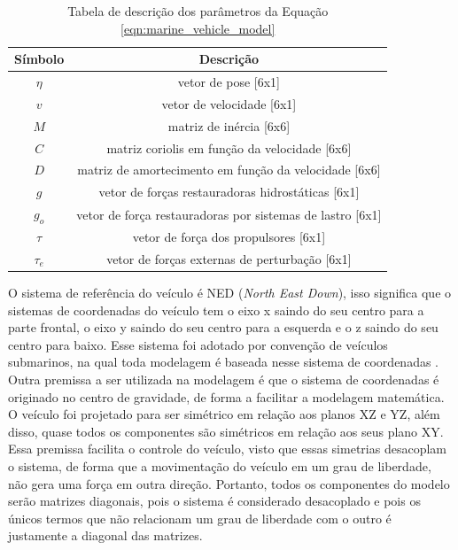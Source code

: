\begin{table}
	\centering
	\label{tab:eqn_param_description}
	\caption{Tabela de descrição dos parâmetros da Equação \ref{eqn:marine_vehicle_model}}
	\begin{tabular}{ | c | c | } 
		\hline
		\textbf{Símbolo} & \textbf{Descrição}\\
		\hline
		$\eta$ & vetor de pose [6x1]\\ 
		\hline
		$v$ & vetor de velocidade [6x1]\\ 
		\hline
		$M$ & matriz de inércia [6x6]\\ 
		\hline
		$C$ & matriz coriolis em função da velocidade [6x6]\\ 
		\hline
		$D$ & matriz de amortecimento em função da velocidade [6x6]\\ 
		\hline
		$g$ & vetor de forças restauradoras hidrostáticas [6x1]\\ 
		\hline
		$g_o$ & vetor de força restauradoras por sistemas de lastro [6x1]\\ 
		\hline
		$\tau$ & vetor de força dos propulsores [6x1]\\ 
		\hline
		$\tau_e$ & vetor de forças externas de perturbação [6x1]\\ 
		\hline
	\end{tabular}
\end{table}

O sistema de referência do veículo é NED (\textit{North East Down}), isso significa que o sistemas de coordenadas do veículo tem o eixo x saindo do seu centro para a parte frontal, o eixo y saindo do seu centro para a esquerda e o z saindo do seu centro para baixo. Esse sistema foi adotado por convenção de veículos submarinos, na qual toda modelagem é baseada nesse sistema de coordenadas \cite{Antonelli2018} \cite{fossen2011handbook} \cite{fossen1994guidance}. Outra premissa a ser utilizada na modelagem é que o sistema de coordenadas é originado no centro de gravidade, de forma a facilitar a modelagem matemática. O veículo foi projetado para ser simétrico em relação aos planos XZ e YZ, além disso, quase todos os componentes são simétricos em relação aos seus plano XY. Essa premissa facilita o controle do veículo, visto que essas simetrias desacoplam o sistema, de forma que a movimentação do veículo em um grau de liberdade, não gera uma força em outra direção. Portanto, todos os componentes do modelo serão matrizes diagonais, pois o sistema é considerado desacoplado e pois os únicos termos que não relacionam um grau de liberdade com o outro é justamente a diagonal das matrizes.

